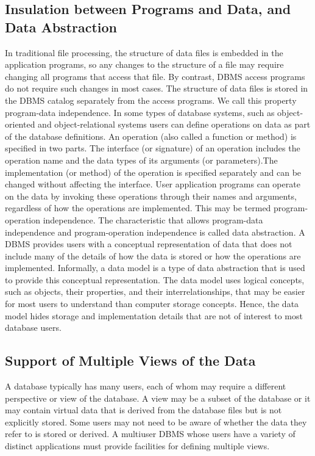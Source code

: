 \subsection{Insulation between Programs and Data, and Data Abstraction}
In traditional file processing, the structure of data files is embedded in the application programs, so any changes to the structure of a file may require changing all programs that access that file. By contrast, DBMS access programs do not require such changes in most cases. The structure of data files is stored in the DBMS catalog separately from the access programs. We call this property program-data independence. In some types of database systems, such as object-oriented and object-relational systems users can define operations on data as part of the database definitions. An operation (also called a function or method) is specified in two parts. The interface (or signature) of an operation includes the operation name and the data types of its arguments (or parameters).The implementation (or method) of the operation is specified separately and can be changed without affecting the interface. User application programs can operate on the data by invoking these operations through their names and arguments, regardless of how the operations are implemented. This may be termed program-operation independence. The characteristic that allows program-data independence and program-operation independence is called data abstraction. A DBMS provides users with a conceptual representation of data that does not include many of the details of how the data is stored or how the operations are implemented. Informally, a data model is a type of data abstraction that is used to provide this conceptual representation. The data model uses logical concepts, such as objects, their properties, and their interrelationships, that may be easier for most users to understand than computer storage concepts. Hence, the data model hides storage and implementation details that are not of interest to most database users.
\thispagestyle{fancy}

\subsection{Support of Multiple Views of the Data}
A database typically has many users, each of whom may require a different perspective or view of the database. A view may be a subset of the database or it may contain virtual data that is derived from the database files but is not explicitly stored. Some users may not need to be aware of whether the data they refer to is stored or derived. A multiuser DBMS whose users have a variety of distinct applications must provide facilities for defining multiple views.
\thispagestyle{fancy}

